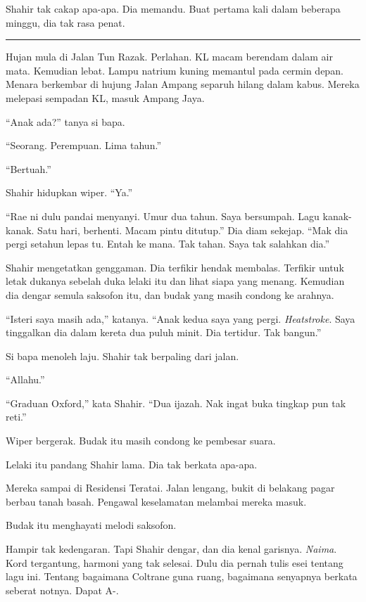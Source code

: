\documentclass[
  11pt,
  a5paper,
  openany,
  oneside]{book}
\begin{document}
Shahir tak cakap apa-apa. Dia memandu. Buat pertama kali dalam beberapa
minggu, dia tak rasa penat.

\begin{center}\rule{0.5\linewidth}{0.5pt}\end{center}

Hujan mula di Jalan Tun Razak. Perlahan. KL macam berendam dalam air
mata. Kemudian lebat. Lampu natrium kuning memantul pada cermin depan.
Menara berkembar di hujung Jalan Ampang separuh hilang dalam kabus.
Mereka melepasi sempadan KL, masuk Ampang Jaya.

``Anak ada?'' tanya si bapa.

``Seorang. Perempuan. Lima tahun.''

``Bertuah.''

Shahir hidupkan wiper. ``Ya.''

``Rae ni dulu pandai menyanyi. Umur dua tahun. Saya bersumpah. Lagu
kanak-kanak. Satu hari, berhenti. Macam pintu ditutup.'' Dia diam
sekejap. ``Mak dia pergi setahun lepas tu. Entah ke mana. Tak tahan.
Saya tak salahkan dia.''

Shahir mengetatkan genggaman. Dia terfikir hendak membalas. Terfikir
untuk letak dukanya sebelah duka lelaki itu dan lihat siapa yang menang.
Kemudian dia dengar semula saksofon itu, dan budak yang masih condong ke
arahnya.

``Isteri saya masih ada,'' katanya. ``Anak kedua saya yang pergi.
\emph{Heatstroke}. Saya tinggalkan dia dalam kereta dua puluh minit. Dia
tertidur. Tak bangun.''

Si bapa menoleh laju. Shahir tak berpaling dari jalan.

``Allahu.''

``Graduan Oxford,'' kata Shahir. ``Dua ijazah. Nak ingat buka tingkap
pun tak reti.''

Wiper bergerak. Budak itu masih condong ke pembesar suara.

Lelaki itu pandang Shahir lama. Dia tak berkata apa-apa.

Mereka sampai di Residensi Teratai. Jalan lengang, bukit di belakang
pagar berbau tanah basah. Pengawal keselamatan melambai mereka masuk.

Budak itu menghayati melodi saksofon.

Hampir tak kedengaran. Tapi Shahir dengar, dan dia kenal garisnya.
\emph{Naima}. Kord tergantung, harmoni yang tak selesai. Dulu dia pernah
tulis esei tentang lagu ini. Tentang bagaimana Coltrane guna ruang,
bagaimana senyapnya berkata seberat notnya. Dapat A-.
\end{document}
